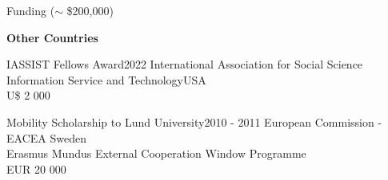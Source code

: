 \begin{rSection}{Funding ($\sim$ \$200,000)}
\vspace{1em}

\begin{center}
\large \textbf {Other Countries}
\end{center}

\par

\begin{rSubsection}
{IASSIST Fellows Award}{2022}
{International Association for Social Science Information Service and Technology}{USA}\\
{U\$ 2 000}
\end{rSubsection}

\begin{rSubsection}
{Mobility Scholarship to Lund University}{2010 - 2011}
{European Commission - EACEA} {Sweden}\\
{Erasmus Mundus External Cooperation Window Programme}\\
{EUR 20 000}\\
\end{rSubsection}

\end{rSection}